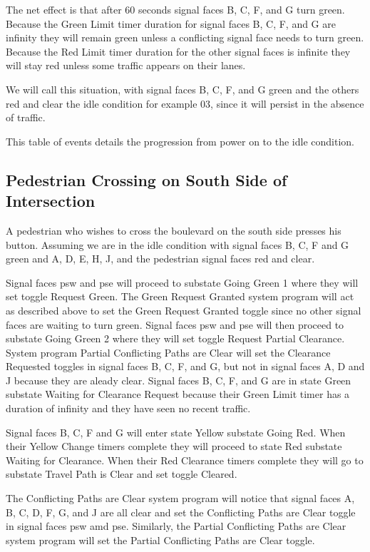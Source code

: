 \documentclass[letterpaper,twoside]{article}
\begin{document}
The net effect is that after 60 seconds signal faces
B, C, F, and G turn green.  Because the Green Limit timer duration for signal
faces B, C, F, and G are infinity they will remain green unless
a conflicting signal face needs to turn green.  Because the Red Limit
timer duration for the other signal faces is infinite they will stay red
unless some traffic appears on their lanes.

We will call this situation, with signal faces B, C, F, and G green
and the others red and clear the idle condition for example 03,
since it will persist in the absence of traffic.

This table of events details the progression from power on to the idle
condition.



\subsection{Pedestrian Crossing on South Side of Intersection}
A pedestrian who wishes to cross the boulevard on the south side
presses his button.  Assuming we are in the idle condition
with signal faces
B, C, F and G green and A, D, E, H, J, and the pedestrian signal faces
red and clear.

Signal faces psw and pse will proceed to substate Going Green 1 where
they will set
toggle Request Green.  The Green Request Granted system program will act
as described above to set the Green Request Granted toggle since no other
signal faces are waiting to turn green.  Signal faces psw and pse will then
proceed to substate Going Green 2 where they will set toggle Request Partial
Clearance.  System program Partial Conflicting Paths are Clear will set
the Clearance Requested toggles in signal faces B, C, F, and G,
but not in signal faces A, D and J because they are aleady clear.
Signal faces B, C, F, and G are in state Green substate Waiting for Clearance
Request because their Green Limit timer has a duration of infinity and
they have seen no recent traffic.

Signal faces B, C, F and G will enter state Yellow substate Going Red.
When their Yellow Change timers complete they will proceed to state Red
substate Waiting for Clearance.
When their Red Clearance timers complete they will go
to substate Travel Path is Clear and set toggle Cleared.

The Conflicting Paths are Clear system program will notice that
signal faces A, B, C, D, F, G, and J are all clear and set the
Conflicting Paths are Clear toggle in signal faces psw amd pse.  Similarly,
the Partial Conflicting Paths are Clear system program will set the
Partial Conflicting Paths are Clear toggle.
\end{document}

